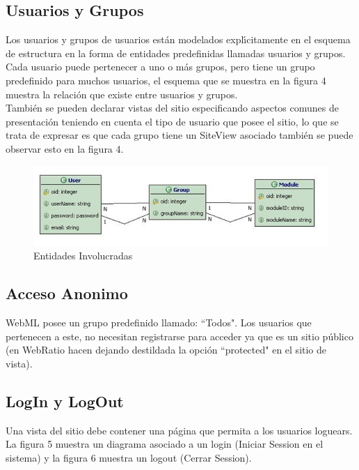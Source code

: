 \subsection{Usuarios y Grupos}

Los usuarios y grupos de usuarios est\'an modelados expl\'{\i}citamente en el esquema
de estructura en la forma de entidades predefinidas llamadas usuarios y grupos.
Cada usuario puede pertenecer a uno o m\'as grupos, pero tiene un grupo 
predefinido para muchos usuarios, el esquema que se muestra en la figura 4
muestra la relaci\'on que existe entre usuarios y grupos. \\[0.5cm]

Tambi\'en se pueden declarar vistas del sitio especificando aspectos comunes de 
presentaci\'on teniendo en cuenta el tipo de usuario que posee el sitio, lo que
se trata de expresar es que cada grupo tiene un SiteView asociado tambi\'en se
puede observar esto en la figura 4.

\begin{figure}[H]
    \centering
    \includegraphics[scale=1]{resourse/usuarios.jpg}
    \caption{Entidades Involucradas}
    \label{TFig:04}
\end{figure} 


\subsection{Acceso Anonimo}

WebML posee un grupo predefinido llamado: ``Todos". Los usuarios que 
pertenecen a este, no necesitan registrarse para acceder ya que es un sitio 
p\'ublico (en WebRatio hacen dejando destildada la opci\'on ``protected" en el 
sitio de vista).

\subsection{LogIn y LogOut}

Una vista del sitio debe contener una p\'agina que permita a los usuarios 
loguears. La figura 5 muestra un diagrama asociado a un login (Iniciar Session
en el sistema) y la figura 6 muestra un logout (Cerrar Session).

